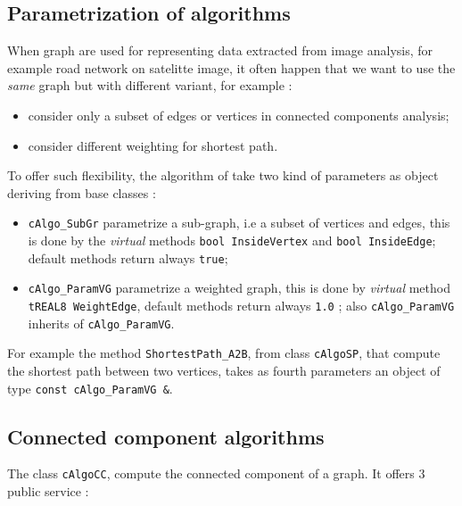 
\subsection{Parametrization of algorithms}

When graph are used for representing data extracted from image analysis, for example road
network on satelitte image, it often happen that we want to use the \emph{same} graph 
but with different variant, for example :

\begin{itemize}
    \item  consider only a subset of edges or vertices in connected components analysis;
    \item  consider different weighting for shortest path.
\end{itemize}

To offer such flexibility, the algorithm of \PPP take two kind of parameters as object
deriving from base classes :

\begin{itemize}
    \item   {\tt cAlgo\_SubGr} parametrize a sub-graph, i.e a subset of vertices and edges,
            this is done by the \emph{virtual} methods {\tt bool InsideVertex} and {\tt bool InsideEdge};
            default methods return always {\tt true};

    \item   {\tt cAlgo\_ParamVG} parametrize a weighted graph, this is done by  \emph{virtual} method
            {\tt tREAL8 WeightEdge}, default methods return always {\tt 1.0} ;
            also {\tt cAlgo\_ParamVG} inherits of  {\tt cAlgo\_ParamVG}.
\end{itemize}

For example the method {\tt ShortestPath\_A2B}, from class {\tt cAlgoSP}, that compute the shortest path
between two vertices, takes as fourth parameters an object of type {\tt const cAlgo\_ParamVG \&}.



\subsection{Connected component algorithms}

The class {\tt cAlgoCC}, compute the connected component of a graph. It offers $3$ public service :

